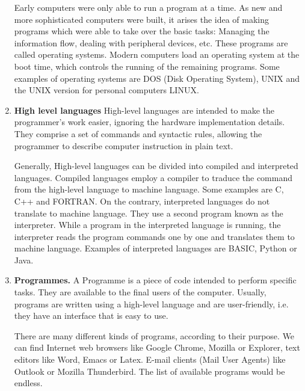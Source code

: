 \begin{paracol}{2}
\begin{enumerate}
Early computers were only able to run a program at a time. As new and more sophisticated computers were built, it arises the idea of making programs which were able to take over the basic tasks:
Managing the information flow, dealing with peripheral devices, etc. These programs are called operating systems. Modern computers load an operating system at the boot time, which controls the running of the remaining programs. Some examples of operating systems are DOS (Disk Operating System), UNIX and the UNIX version for personal computers LINUX.       

\item \textbf{High level languages} 
High-level languages are intended to make the programmer's work easier, ignoring the hardware implementation details.   They comprise a set of commands and syntactic rules, allowing the programmer to describe computer instruction in plain text.

Generally, High-level languages can be divided into compiled and interpreted languages. Compiled languages employ a compiler to traduce the command from the high-level language to machine language. Some examples are C, C++ and FORTRAN. On the contrary, interpreted languages do not translate to machine language. They use a second program known as the interpreter. While a program in the interpreted language is running, the interpreter reads the program commands one by one and translates them to machine language. Examples of interpreted languages are BASIC, Python or Java.  


\item \textbf{Programmes.}  
A Programme is a piece of code intended to perform specific tasks. They are available to the final users of the computer. Usually, programs are written using a high-level language and are user-friendly, i.e. they have an interface that is easy to use.

There are many different kinds of programs, according to their purpose. We can find Internet web browsers like Google Chrome, Mozilla or Explorer, text editors like Word, Emacs or Latex.    
E-mail clients (Mail User Agents) like Outlook or Mozilla Thunderbird. The list of available programs would be endless. 
\end{enumerate}

\end{paracol}



